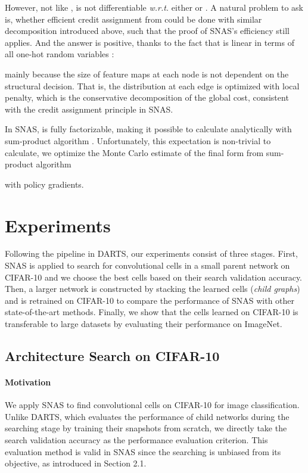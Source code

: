 \documentclass{article} \usepackage{iclr2019_conference,times}
\begin{document}
However, not like ,  is not differentiable \textit{w.r.t.} either  or . A natural problem to ask is, whether efficient credit assignment from  could be done with similar decomposition introduced above, such that the proof of SNAS's efficiency still applies. And the answer is positive, thanks to the fact that  is linear in terms of all one-hot random variables : 

mainly because the size of feature maps at each node is not dependent on the structural decision. That is, the distribution at each edge  is optimized with local penalty, which is the conservative decomposition of the global cost, consistent with the credit assignment principle in SNAS. 

In SNAS,  is fully factorizable, making it possible to calculate  analytically with sum-product algorithm \citep{kschischang2001factor}. Unfortunately, this expectation is non-trivial to calculate, we optimize the Monte Carlo estimate of the final form from sum-product algorithm

with policy gradients.



\section{Experiments}

Following the pipeline in DARTS, our experiments consist of three stages. First, SNAS is applied to search for convolutional cells in a small parent network on CIFAR-10 and we choose the best cells based on their search validation accuracy. Then, a larger network is constructed by stacking the learned cells (\textit{child graphs}) and is retrained on CIFAR-10 to compare the performance of SNAS with other state-of-the-art methods. Finally, we show that the cells learned on CIFAR-10 is transferable to large datasets by evaluating their performance on ImageNet.

\subsection{Architecture Search on CIFAR-10}

\paragraph{Motivation}

We apply SNAS to find convolutional cells on CIFAR-10 for image classification. Unlike DARTS, which evaluates the performance of child networks during the searching stage by training their snapshots from scratch, we directly take the search validation accuracy as the performance evaluation criterion. This evaluation method is valid in SNAS since the searching is unbiased from its objective, as introduced in Section 2.1. 
\end{document}

